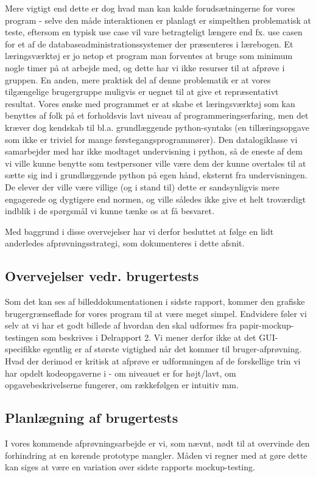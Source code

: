 \documentclass[10pt,a4paper,danish]{article}
\begin{document}
Mere vigtigt end dette er dog hvad man kan kalde forudsætningerne for vores program - selve den
måde interaktionen er planlagt er simpelthen problematisk at teste, eftersom en typisk use case
vil vare betragteligt længere end fx. use casen for et af de databaseadministrationssystemer der
præsenteres i lærebogen. Et læringsværktøj er jo netop et program man forventes at bruge som
minimum nogle timer på at arbejde med, og dette har vi ikke resurser til at afprøve i gruppen. 
En anden, mere praktisk del af denne problematik er at vores tilgængelige brugergruppe muligvis er 
uegnet til at give et repræsentativt resultat. Vores ønske med programmet er at skabe et læringsværktøj
som kan benyttes af folk på et forholdsvis lavt niveau af programmeringserfaring, men det kræver
dog kendskab til bl.a. grundlæggende python-syntaks (en tillæringsopgave som ikke er triviel for
mange førstegangsprogrammører). Den datalogiklasse vi samarbejder med har ikke modtaget undervisning
i python, så de eneste af dem vi ville kunne benytte som testpersoner ville være dem der kunne 
overtales til at sætte sig ind i grundlæggende python på egen hånd, eksternt fra undervisningen. 
De elever der ville være villige (og i stand til) dette er sandsynligvis mere engagerede og dygtigere
end normen, og ville således ikke give et helt troværdigt indblik i de spørgsmål vi kunne tænke os
at få besvaret. 

Med baggrund i disse overvejelser har vi derfor besluttet at følge en lidt anderledes afprøvningsstrategi,
som dokumenteres i dette afsnit. 

\subsection{Overvejelser vedr. brugertests}
Som det kan ses af billeddokumentationen i sidste rapport, kommer den grafiske brugergrænseflade
for vores program til at være meget simpel. Endvidere føler vi selv at vi har et godt
billede af hvordan den skal udformes fra papir-mockup-testingen som beskrives i Delrapport 2.
Vi mener derfor ikke at det GUI-specifikke egentlig er af største vigtighed når det kommer til bruger-afprøvning. 
Hvad der derimod er kritisk at afprøve er udformningen af de forskellige trin vi har opdelt 
kodeopgaverne i - om niveauet er for højt/lavt, om opgavebeskrivelserne fungerer, om rækkefølgen
er intuitiv mm. 

\subsection{Planlægning af brugertests}
I vores kommende afprøvningsarbejde er vi, som nævnt, nødt til at overvinde den forhindring at en
kørende prototype mangler. Måden vi regner med
at gøre dette kan siges at være en variation over sidste rapports mockup-testing.
\end{document}
